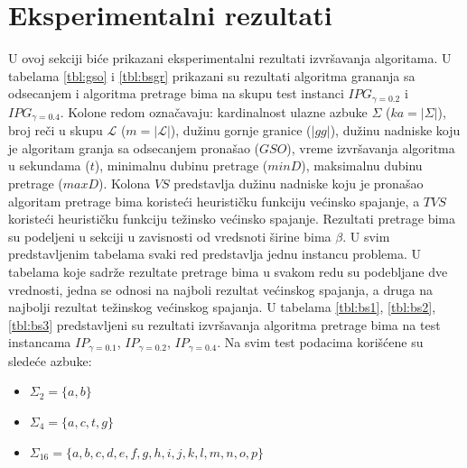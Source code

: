\documentclass[12pt,oneside]{memoir}
\begin{document}
\section{Eksperimentalni rezultati}
\label{sec:ekspRezultati}
U ovoj sekciji biće prikazani eksperimentalni rezultati izvršavanja algoritama.
U tabelama \ref{tbl:gso} i \ref{tbl:bsgr} prikazani su rezultati algoritma grananja sa odsecanjem
i algoritma pretrage bima
na skupu test instanci $IPG_{\gamma=0.2}$ i $IPG_{\gamma=0.4}$. 
Kolone redom označavaju: kardinalnost ulazne azbuke $\Sigma$ ($ka=|\Sigma|$),
broj reči u skupu $\mathcal{L}$ ($m=|\mathcal{L}|$), dužinu gornje granice ($|gg|$),
dužinu nadniske koju je algoritam granja sa odsecanjem pronašao ($GSO$),
vreme izvršavanja algoritma u sekundama ($t$),
minimalnu dubinu pretrage ($minD$),
maksimalnu dubinu pretrage ($maxD$).
Kolona $VS$ predstavlja
dužinu nadniske koju je pronašao algoritam pretrage bima koristeći
heurističku funkciju većinsko spajanje, a $TVS$ koristeći
heurističku funkciju težinsko većinsko spajanje.
Rezultati pretrage bima su podeljeni u sekciji u zavisnosti od
vredsnoti širine bima $\beta$.
U svim predstavljenim tabelama svaki red predstavlja jednu instancu problema.
U tabelama koje sadrže rezultate pretrage bima u svakom redu su podebljane dve
vrednosti, jedna se odnosi na najboli rezultat većinskog spajanja, a druga na
najbolji rezultat težinskog većinskog spajanja.
U tabelama \ref{tbl:bs1}, \ref{tbl:bs2}, \ref{tbl:bs3} predstavljeni su rezultati
izvršavanja algoritma pretrage bima na test instancama
$IP_{\gamma=0.1}$, $IP_{\gamma=0.2}$, $IP_{\gamma=0.4}$.
Na svim test podacima korišćene su sledeće azbuke:
\begin{itemize}
  \item $\Sigma_{2}=\{a,b\}$
  \item $\Sigma_{4}=\{a,c,t,g\}$
  \item $\Sigma_{16}=\{a,b,c,d,e,f,g,h,i,j,k,l,m,n,o,p\}$
\end{itemize}
\end{document}
